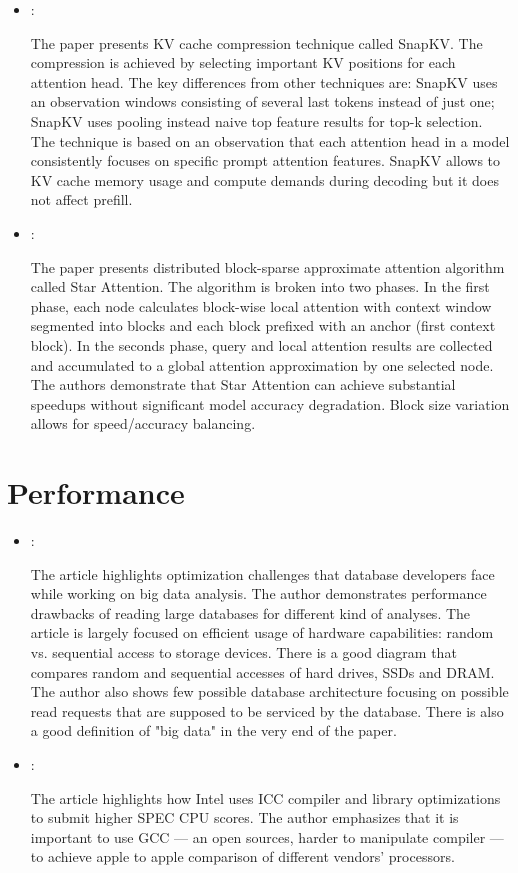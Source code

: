\begin{itemize}
    \item \cite{Li:SnapKV:2024}:

    The paper presents KV cache compression technique called SnapKV. The compression is achieved by selecting important KV positions for each attention head. The key differences from other techniques are: SnapKV uses an observation windows consisting of several last tokens instead of just one; SnapKV uses pooling instead naive top feature results for top-k selection. The technique is based on an observation that each attention head in a model consistently focuses on specific prompt attention features. SnapKV allows to KV cache memory usage and compute demands during decoding but it does not affect prefill.

    \item \cite{Acharya:StarAttention:2025}:

    The paper presents distributed block-sparse approximate attention algorithm called Star Attention. The algorithm is broken into two phases. In the first phase, each node calculates block-wise local attention with context window segmented into blocks and each block prefixed with an anchor (first context block). In the seconds phase, query and local attention results are collected and accumulated to a global attention approximation by one selected node. The authors demonstrate that Star Attention can achieve substantial speedups without significant model accuracy degradation. Block size variation allows for speed/accuracy balancing.
\end{itemize}

\section*{Performance}
\begin{itemize}
    \item \cite{Jacobs:DataBasePerformance:2009}:

    The article highlights optimization challenges that database developers face while working on big data analysis. The author demonstrates performance drawbacks of reading large databases for different kind of analyses. The article is largely focused on efficient usage of hardware capabilities: random vs. sequential access to storage devices. There is a good diagram that compares random and sequential accesses of hard drives, SSDs and DRAM. The author also shows few possible database architecture focusing on possible read requests that are supposed to be serviced by the database. There is also a good definition of "big data" in the very end of the paper.

    \item \cite{Gwennap:IntelHidesBehindICC:2017}:

    The article highlights how Intel uses ICC compiler and library optimizations to submit higher SPEC CPU scores. The author emphasizes that it is important to use GCC --- an open sources, harder to manipulate compiler --- to achieve apple to apple comparison of different vendors' processors.
\end{itemize}


